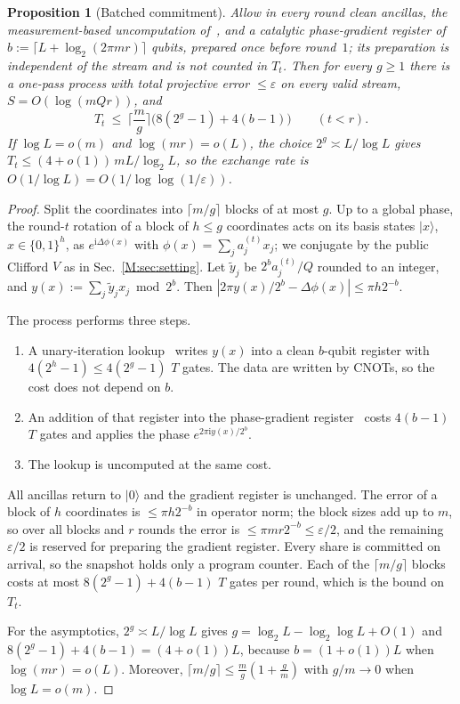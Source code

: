 \documentclass[aps,prx,twocolumn,superscriptaddress,nofootinbib,longbibliography]{revtex4-2}
\theoremstyle{plain}
\newtheorem{proposition}{Proposition}
\theoremstyle{definition}
\theoremstyle{remark}
\begin{document}
\begin{proposition}[Batched commitment]\label{prop:batch}
Allow in every round clean ancillas, the measurement-based uncomputation of~\cite{Gidney}, and a catalytic phase-gradient register of $b:=\lceil L+\log_2(2\pi mr)\rceil$ qubits, prepared once before round~$1$; its preparation is independent of the stream and is not counted in $T_t$. Then for every $g\ge1$ there is a one-pass process with total projective error $\le\varepsilon$ on every valid stream, $S=O(\log(mQr))$, and
\[
T_t\ \le\ \Big\lceil\frac mg\Big\rceil\big(8(2^g-1)+4(b-1)\big)\qquad(t<r).
\]
If $\log L=o(m)$ and $\log(mr)=o(L)$, the choice $2^g\asymp L/\log L$ gives $T_t\le(4+o(1))\,mL/\log_2L$, so the exchange rate is $O(1/\log L)=O(1/\log\log(1/\varepsilon))$.
\end{proposition}
\begin{proof}
Split the coordinates into $\lceil m/g\rceil$ blocks of at most $g$. Up to a global phase, the round-$t$ rotation of a block of $h\le g$ coordinates acts on its basis states $|x\rangle$, $x\in\{0,1\}^h$, as $e^{\mathrm i\Delta\phi(x)}$ with $\phi(x)=\sum_{j}a^{(t)}_jx_j$; we conjugate by the public Clifford $V$ as in Sec.~\ref{M:sec:setting}. Let $\tilde y_j$ be $2^ba^{(t)}_j/Q$ rounded to an integer, and $y(x):=\sum_j\tilde y_jx_j\bmod2^b$. Then $|2\pi y(x)/2^b-\Delta\phi(x)|\le\pi h2^{-b}$.

The process performs three steps.
\begin{enumerate}\setlength\itemsep{0pt}
\item A unary-iteration lookup~\cite{Babbush} writes $y(x)$ into a clean $b$-qubit register with $4(2^h-1)\le4(2^g-1)$ $T$ gates. The data are written by CNOTs, so the cost does not depend on $b$.
\item An addition of that register into the phase-gradient register~\cite{Gidney} costs $4(b-1)$ $T$ gates and applies the phase $e^{2\pi\mathrm iy(x)/2^b}$.
\item The lookup is uncomputed at the same cost.
\end{enumerate}
All ancillas return to $|0\rangle$ and the gradient register is unchanged. The error of a block of $h$ coordinates is $\le\pi h2^{-b}$ in operator norm; the block sizes add up to $m$, so over all blocks and $r$ rounds the error is $\le\pi mr2^{-b}\le\varepsilon/2$, and the remaining $\varepsilon/2$ is reserved for preparing the gradient register. Every share is committed on arrival, so the snapshot holds only a program counter. Each of the $\lceil m/g\rceil$ blocks costs at most $8(2^g-1)+4(b-1)$ $T$ gates per round, which is the bound on $T_t$. 

For the asymptotics, $2^g\asymp L/\log L$ gives $g=\log_2L-\log_2\log L+O(1)$ and $8(2^g-1)+4(b-1)=(4+o(1))L$, because $b=(1+o(1))L$ when $\log(mr)=o(L)$. Moreover, $\lceil m/g\rceil\le\frac mg(1+\frac gm)$ with $g/m\to0$ when $\log L=o(m)$.
\end{proof}
\end{document}
